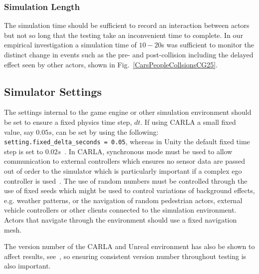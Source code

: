 \documentclass[letterpaper, 10 pt, journal, twoside]{IEEEtran}
\begin{document}


\subsubsection{Simulation Length} 
The simulation time should be sufficient to record an interaction between actors but not so long that the testing take an inconvenient time to complete. In our empirical investigation a simulation time of $10-20$s was sufficient to monitor the distinct change in events such as the pre- and post-collision including the delayed effect seen by other actors, shown in Fig.~\ref{CarsPeopleCollsionsCG25}.



\subsection{Simulator Settings}
The settings internal to the game engine or other simulation environment should be set to ensure a fixed physics time step, $dt$. If using CARLA a small fixed value, say $0.05s$, can be set by using the following: \texttt{setting.fixed\_delta\_seconds = 0.05}, whereas in Unity the default fixed time step is set to $0.02s$~\cite{MonoBehaviour_unity}. In CARLA, synchronous mode must be used to allow communication to external controllers which ensures no sensor data are passed out of order to the simulator which is particularly important if a complex ego controller is used~\cite{carla_sim_config}. 
%
The use of random numbers must be controlled through the use of fixed seeds which might be used to control variations of background effects, e.g. weather patterns, or the navigation of random pedestrian actors, external vehicle controllers or other clients connected to the simulation environment. 
%
Actors that navigate through the environment should use a fixed navigation mesh. 

The version number of the CARLA and Unreal environment has also be shown to affect results, see~\cite{TSLUnrealEngineTesting}, so ensuring consistent version number throughout testing is also important.
\end{document}
